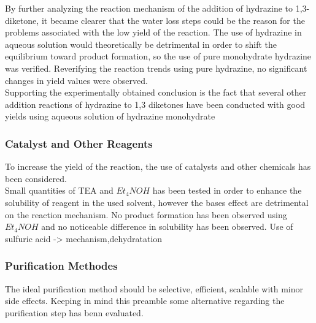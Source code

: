 \documentclass[../Master.tex]{subfiles}
\begin{document}
By further analyzing the reaction mechanism of the addition of hydrazine to 1,3-diketone, it became clearer that the water loss steps could be the reason for the problems associated with the low yield of the reaction. The use of hydrazine in aqueous solution would theoretically be detrimental in order to shift the equilibrium toward product formation, so the use of pure monohydrate hydrazine was verified.
Reverifying the reaction trends using pure hydrazine, no significant changes in yield values were observed.\\
Supporting the experimentally obtained conclusion is the fact that several other addition reactions of hydrazine to 1,3 diketones have been conducted with good yields using aqueous solution of hydrazine monohydrate

\subsubsection{Catalyst and Other Reagents}\label{sec:cat-other-reagents}

To increase the yield of the reaction, the use of catalysts and other chemicals has been considered. \\
Small quantities of TEA and \(Et_{4}NOH\) has been tested in order to enhance the solubility of reagent in the used solvent, however the bases effect are detrimental on the reaction mechanism. No product formation has been observed using \(Et_{4}NOH\) and no noticeable difference in solubility has been observed.
Use of sulfuric acid -> mechanism,dehydratation

\subsubsection{Purification Methodes}\label{sec:pyr-purification}

The ideal purification method should be selective, efficient, scalable with minor side effects. Keeping in mind this preamble some alternative regarding the purification step has benn evaluated.
\end{document}
